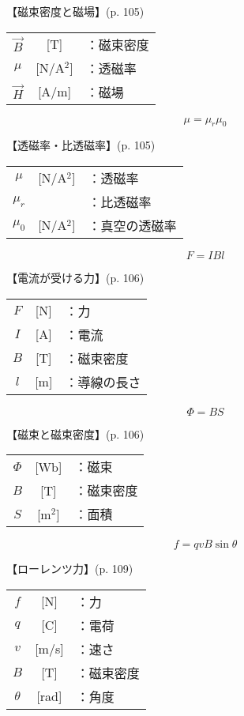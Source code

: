 \documentclass[10pt]{jarticle}
\begin{document}
\vskip3mm
\noindent
【磁束密度と磁場】{\footnotesize (p. 105)}

\begin{tabular}{ccl}
$\vec{B}$	&[T]	&：磁束密度\\
$\mu$	&[N/A$^2$]	&：透磁率\\
$\vec{H}$	&[A/m]	&：磁場
\end{tabular}




\newpage
\[
\mu = \mu_r \mu_0
\]


\vskip3mm
\noindent
【透磁率・比透磁率】{\footnotesize (p. 105)}

\begin{tabular}{ccl}
$\mu$	&[N/A$^2$]	&：透磁率\\
$\mu_r$	&	&：比透磁率\\
$\mu_0$	&[N/A$^2$]	&：真空の透磁率
\end{tabular}




\newpage
\[
F = I B l
\]


\vskip3mm
\noindent
【電流が受ける力】{\footnotesize (p. 106)}

\begin{tabular}{ccl}
$F$	&[N]	&：力 \\
$I$	&[A]	&：電流\\
$B$	&[T]	&：磁束密度\\
$l$	&[m]	&：導線の長さ\\
\end{tabular}




\newpage
\[
\Phi = B S
\]


\vskip3mm
\noindent
【磁束と磁束密度】{\footnotesize (p. 106)}

\begin{tabular}{ccl}
$\Phi$	&[Wb]	&：磁束\\
$B$	&[T]	&：磁束密度\\
$S$	&[m$^2$]	&：面積
\end{tabular}





\newpage
\[
f = q v B \sin \theta
\]


\vskip3mm
\noindent
【ローレンツ力】{\footnotesize (p. 109)}

\begin{tabular}{ccl}
$f$	&[N]	&：力 \\
$q$	&[C]	&：電荷\\
$v$	&[m/s]	&：速さ\\
$B$	&[T]	&：磁束密度\\
$\theta$	&[rad]	&：角度
\end{tabular}
\end{document}
